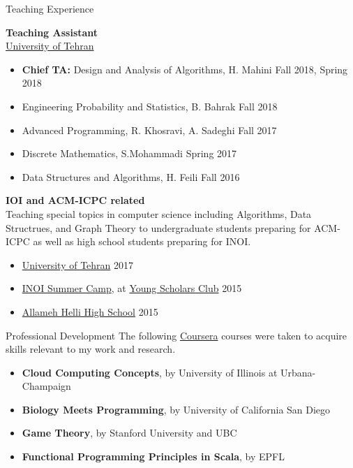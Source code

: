 \documentclass{resume} %
\begin{document}
\begin{rSection}{Teaching Experience}
	
	{\bf Teaching Assistant}
	\\\href{http://ut.ac.ir/en}{University of Tehran}
	\begin{itemize}
		\item {\bf Chief TA:} Design and Analysis of Algorithms, H. Mahini \hfill Fall 2018, Spring 2018
		\item Engineering Probability and Statistics, B. Bahrak \hfill Fall 2018
		\item Advanced Programming, R. Khosravi, A. Sadeghi \hfill Fall 2017
		\item Discrete Mathematics, S.Mohammadi \hfill Spring 2017
		\item Data Structures and Algorithms, H. Feili \hfill Fall 2016
	\end{itemize}
	
	{\bf IOI and ACM-ICPC related}
	\\Teaching special topics in computer science including Algorithms, Data Structrues,
	and Graph Theory to undergraduate students preparing for ACM-ICPC as well as high school
	students preparing for INOI.
	\begin{itemize}
		\item \href{http://ut.ac.ir/en}{University of Tehran} \hfill 2017
		\item \href{http://inoi.ir/}{INOI Summer Camp}, at \href{http://ysc.ac.ir/}{Young Scholars Club} \hfill 2015
		\item \href{http://www.helli.ir/}{Allameh Helli High School} \hfill 2015
	\end{itemize}
	
\end{rSection}

\vspace{15mm}


\begin{rSection}{Professional Development}
	The following \href{https://www.coursera.org/}{Coursera} courses were taken to acquire skills relevant to my work and research.
	\begin{itemize}
		\item {\bf Cloud Computing Concepts}, by University of Illinois at Urbana-Champaign
		\item {\bf Biology Meets Programming}, by University of California San Diego
		\item {\bf Game Theory}, by Stanford University and UBC
		\item {\bf Functional Programming Principles in Scala}, by EPFL
	\end{itemize}
\end{rSection}
\end{document}
